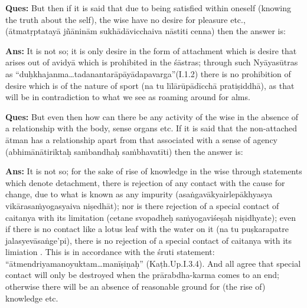 \vskip -1pt


\vskip -1pt


\vskip -1pt

\textbf{Ques:} But then if it is said that due to being satisfied within oneself (knowing the truth about the self), the wise have no desire for pleasure etc., (ātmatṛptatayā jñāninām sukhādāvicchaiva nāstiti cenna) then the answer is:

\vskip -1pt

\textbf{Ans:} It is not so; it is only desire in the form of attachment which is desire that arises out of avidyā which is prohibited in the śāstras; through such Nyāyasūtras as “duḥkhajanma…tadanantarāpāyādapavarga”\break (I.1.2) there is no prohibition of desire which is of the nature of sport (na tu līlārūpādīcchā pratiṣiddhā), as that will be in contradiction to what we see as roaming around for alms.

\vskip -1pt

\textbf{Ques:} But even then how can there be any activity of the wise in the absence of a relationship with the body, sense organs etc. If it is said that the non-attached ātman has a relationship apart from that associated with a sense of agency (abhimānātiriktaḥ saṁbandhaḥ saṁbhavatīti) then the answer is:

\vskip -1pt

\textbf{Ans:} It is not so; for the sake of rise of knowledge in the wise through statements which denote detachment, there is rejection of any contact with the cause for change, due to what is known as any impurity (asaṅgavākyairlepākhyasya vikārasaṁyogasyaiva niṣedhāt); nor is there rejection of a special contact of caitanya with its limitation (cetane svopadheḥ saṁyogaviśeṣah niṣidhyate); even if there is no contact like a lotus leaf with the water on it (na tu puṣkarapatre jalasyevāsaṅge’pi), there is no rejection of a special contact of caitanya with its limiation . This is in accordance with the śruti statement: “ātmendriyamanoyuktam…manīṣiṇaḥ” (Kaṭh.Up.I.3.4). And all agree that special contact will only be destroyed when the prārabdha-karma comes to an end; otherwise there will be an absence of reasonable ground for (the rise of) knowledge etc.

